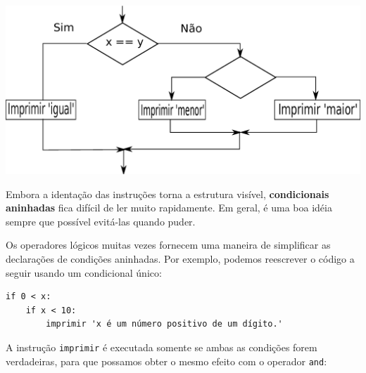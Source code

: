 
\beforefig
\centerline{\includegraphics[height=2.50in]{figs2/nested.eps}}
\afterfig


Embora a identação das instruções torna a estrutura
visível, {\bf condicionais aninhadas} fica difícil de ler muito
rapidamente. Em geral, é uma boa idéia sempre que possível evitá-las quando puder.



Os operadores lógicos muitas vezes fornecem uma maneira de simplificar as declarações de condições
aninhadas. Por exemplo, podemos reescrever o código a seguir usando um
condicional único:


\beforeverb
\begin{verbatim}
if 0 < x:
    if x < 10:
        imprimir 'x é um número positivo de um dígito.'
\end{verbatim}
%
A instrução {\tt imprimir} é executada somente se ambas as condições forem 
verdadeiras, para que possamos obter o mesmo efeito com o operador {\tt and}:

